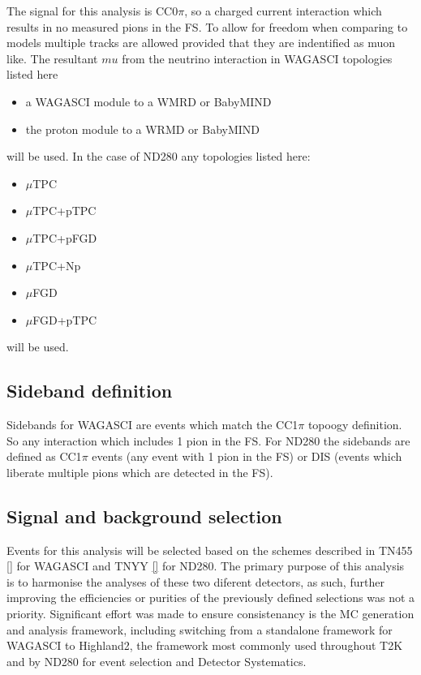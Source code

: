 \documentclass[%
 reprint,
 amsmath,amssymb,
 aps,
]{revtex4-2}
\begin{document}
The signal for this analysis is CC0$\pi$, so a charged current interaction which results in no measured pions in the FS. To allow for freedom when comparing to models multiple tracks are allowed provided that they are indentified as muon like. The resultant $mu$ from the neutrino interaction in WAGASCI topologies listed here 
\begin{itemize}
    \item a WAGASCI module to a WMRD or BabyMIND
    \item the proton module to a WRMD or BabyMIND
\end{itemize} 
will be used. In the case of ND280 any topologies listed here:
\begin{itemize}
    \item $\mu$TPC 
    \item $\mu$TPC+pTPC
    \item $\mu$TPC+pFGD
    \item $\mu$TPC+Np
    \item $\mu$FGD 
    \item $\mu$FGD+pTPC 
\end{itemize} 
will be used. 

\subsection{Sideband definition}
\label{sec:sideband}

Sidebands for WAGASCI are events which match the CC1$\pi$ topoogy definition. So any interaction which includes 1 pion in the FS. For ND280 the sidebands are defined as CC1$\pi$ events (any event with 1 pion in the FS) or DIS (events which liberate multiple pions which are detected in the FS).

\subsection{Signal and background selection}
\label{sec:selection}

Events for this analysis will be selected based on the schemes described in TN455 \ref{} for WAGASCI and TNYY \ref{} for ND280. The primary purpose of this analysis is to harmonise the analyses of these two diferent detectors, as such, further improving the efficiencies or purities of the previously defined selections was not a priority. Significant effort was made to ensure consistenancy is the MC generation and analysis framework, including switching from a standalone framework for WAGASCI to Highland2, the framework most commonly used throughout T2K and by ND280 for event selection and Detector Systematics. 
\end{document}
